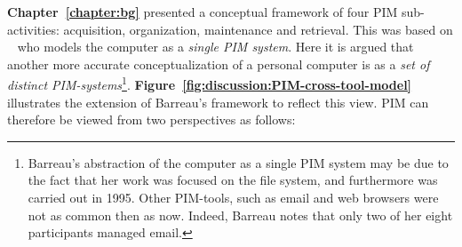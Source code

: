 \textbf{Chapter~\ref{chapter:bg}} presented a conceptual framework of four PIM sub-activities: acquisition, organization, maintenance and retrieval. This was based on ~\citet{barreau:95} who models the computer as a \textit{single PIM system}.  %
Here it is argued that another more accurate conceptualization of a personal computer is as a \textit{set of distinct PIM-systems}\footnote{Barreau's abstraction of the computer as a single PIM system may be due to the fact that her work was focused on the file system, and furthermore was carried out in 1995.  Other PIM-tools, such as email and web browsers were not as common then as now. Indeed, Barreau notes that only two of her eight participants managed email.}.
\textbf{Figure~\ref{fig:discussion:PIM-cross-tool-model}} illustrates the extension of Barreau's framework to reflect this view.  PIM can therefore be viewed from two perspectives as follows:

